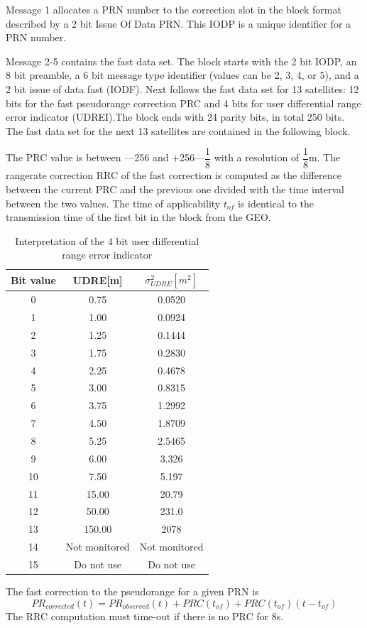 		Message 1 allocates a PRN number to the correction slot in the block format described by a 2 bit Issue Of Data PRN. This IODP is a unique identifier for a PRN number.
		
		Message 2-5 contains the fast data set. The block starts with the 2 bit IODP, an 8 bit preamble, a 6 bit message type identifier (values can be 2, 3, 4, or 5), and a 2 bit issue of data fast (IODF). Next follows the fast data set for 13 satellites: 12 bits for the fast pseudorange correction PRC and 4 bits for user differential range error indicator (UDREI).The block ends with 24 parity bits, in total 250 bits. The fast data set for the next 13 satellites are contained in the following block.
		
		The PRC value is between —256 and +256—$\dfrac{1}{8}$ with a resolution of $\dfrac{1}{8}$m. The rangerate correction RRC of the fast correction is computed as the difference between the current PRC and the previous one divided with the time interval between the two values. The time of applicability $t_{of}$ is identical to the transmission time of the first bit in the block from the GEO.
		\begin{table}[h]
			\centering
			\caption{Interpretation of the 4 bit user differential range error indicator}
			\label{tab:9.10}
			\begin{tabular}{ccc}
				\hline 
				Bit value & UDRE[m] & $\sigma^2_{UDRE}[m^2]$ \\ 
				\hline 
				0 & 0.75 & 0.0520\\
				1 & 1.00 & 0.0924\\
				2 & 1.25 & 0.1444\\
				3 & 1.75 & 0.2830\\
				4 & 2.25 & 0.4678\\
				5 & 3.00 & 0.8315\\
				6 & 3.75 & 1.2992\\
				7 & 4.50 & 1.8709\\
				8 & 5.25 & 2.5465\\
				9 & 6.00 & 3.326\\
				10 & 7.50 & 5.197\\
				11 & 15.00 & 20.79\\
				12 & 50.00 & 231.0\\
				13 & 150.00 & 2078\\
				14 & Not monitored & Not monitored\\
				15 & Do not use & Do not use\\
				\hline
			\end{tabular} 
		\end{table}
		The fast correction to the pseudorange for a given PRN is
		\begin{equation}\label{eq:9.51}
			PR_{corrected}(t)=PR_{observed}(t)+PRC(t_{of})+PRC(t_{of})(t-t_{of})
		\end{equation}
		The RRC computation must time-out if there is no PRC for 8s.
		
